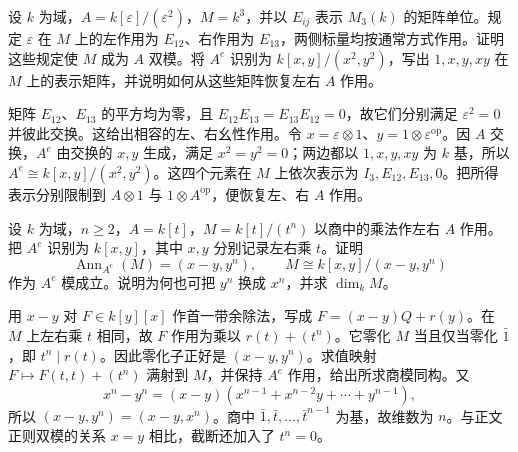 \begin{exercise}\label{b2:ex:11-dual-number-enveloping-matrices}
	设 \(k\) 为域，\(A=k[\varepsilon]/(\varepsilon^2)\)，\(M=k^3\)，并以 \(E_{ij}\) 表示 \(M_3(k)\) 的矩阵单位。规定 \(\varepsilon\) 在 \(M\) 上的左作用为 \(E_{12}\)、右作用为 \(E_{13}\)，两侧标量均按通常方式作用。证明这些规定使 \(M\) 成为 \(A\) 双模。将 \(A^e\) 识别为 \(k[x,y]/(x^2,y^2)\)，写出 \(1,x,y,xy\) 在 \(M\) 上的表示矩阵，并说明如何从这些矩阵恢复左右 \(A\) 作用。
\end{exercise}
\begin{solution}
	矩阵 \(E_{12}\)、\(E_{13}\) 的平方均为零，且 \(E_{12}E_{13}=E_{13}E_{12}=0\)，故它们分别满足 \(\varepsilon^2=0\) 并彼此交换。这给出相容的左、右幺性作用。令 \(x=\varepsilon\otimes1\)、\(y=1\otimes\varepsilon^{\mathrm{op}}\)。因 \(A\) 交换，\(A^e\) 由交换的 \(x,y\) 生成，满足 \(x^2=y^2=0\)；两边都以 \(1,x,y,xy\) 为 \(k\) 基，所以 \(A^e\cong k[x,y]/(x^2,y^2)\)。这四个元素在 \(M\) 上依次表示为 \(I_3,E_{12},E_{13},0\)。把所得表示分别限制到 \(A\otimes1\) 与 \(1\otimes A^{\mathrm{op}}\)，便恢复左、右 \(A\) 作用。
\end{solution}

\begin{exercise}\label{b2:ex:11-polynomial-bimodule-annihilator}
	设 \(k\) 为域，\(n\ge2\)，\(A=k[t]\)，\(M=k[t]/(t^n)\) 以商中的乘法作左右 \(A\) 作用。把 \(A^e\) 识别为 \(k[x,y]\)，其中 \(x,y\) 分别记录左右乘 \(t\)。证明
	\[
		\operatorname{Ann}_{A^e}(M)=(x-y,y^n), \qquad M\cong k[x,y]/(x-y,y^n)
	\]
	作为 \(A^e\) 模成立。说明为何也可把 \(y^n\) 换成 \(x^n\)，并求 \(\dim_kM\)。
\end{exercise}
\begin{solution}
	用 \(x-y\) 对 \(F\in k[y][x]\) 作首一带余除法，写成 \(F=(x-y)Q+r(y)\)。在 \(M\) 上左右乘 \(t\) 相同，故 \(F\) 作用为乘以 \(r(t)+(t^n)\)。它零化 \(M\) 当且仅当零化 \(\bar1\)，即 \(t^n\mid r(t)\)。因此零化子正好是 \((x-y,y^n)\)。求值映射 \(F\mapsto F(t,t)+(t^n)\) 满射到 \(M\)，并保持 \(A^e\) 作用，给出所求商模同构。又
	\[
		x^n-y^n=(x-y)(x^{n-1}+x^{n-2}y+\cdots+y^{n-1}),
	\]
	所以 \((x-y,y^n)=(x-y,x^n)\)。商中 \(\bar1,\bar t,\ldots,\bar t^{n-1}\) 为基，故维数为 \(n\)。与正文正则双模的关系 \(x=y\) 相比，截断还加入了 \(t^n=0\)。
\end{solution}


